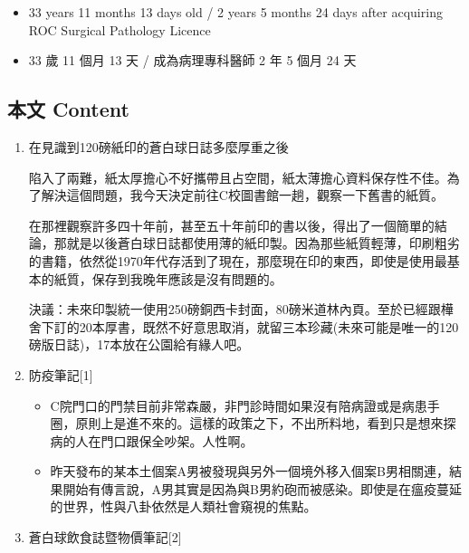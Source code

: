 \documentclass[
]{article}
\providecommand{\tightlist}{%
  \setlength{\itemsep}{0pt}\setlength{\parskip}{0pt}}
\begin{document}
\begin{itemize}
\tightlist
\item
  33 years 11 months 13 days old / 2 years 5 months 24 days after
  acquiring ROC Surgical Pathology Licence
\item
  33 歲 11 個月 13 天 / 成為病理專科醫師 2 年 5 個月 24 天
\end{itemize}

\hypertarget{ux672cux6587-content-4}{%
\subsection{本文 Content}\label{ux672cux6587-content-4}}

\begin{enumerate}
\def\labelenumi{\arabic{enumi}.}
\item
  在見識到120磅紙印的蒼白球日誌多麼厚重之後

  陷入了兩難，紙太厚擔心不好攜帶且占空間，紙太薄擔心資料保存性不佳。為了解決這個問題，我今天決定前往C校圖書館一趟，觀察一下舊書的紙質。

  在那裡觀察許多四十年前，甚至五十年前印的書以後，得出了一個簡單的結論，那就是以後蒼白球日誌都使用薄的紙印製。因為那些紙質輕薄，印刷粗劣的書籍，依然從1970年代存活到了現在，那麼現在印的東西，即使是使用最基本的紙質，保存到我晚年應該是沒有問題的。

  決議：未來印製統一使用250磅銅西卡封面，80磅米道林內頁。至於已經跟樺舍下訂的20本厚書，既然不好意思取消，就留三本珍藏(未來可能是唯一的120磅版日誌)，17本放在公園給有緣人吧。
\item
  防疫筆記{[}1{]}

  \begin{itemize}
  \item
    C院門口的門禁目前非常森嚴，非門診時間如果沒有陪病證或是病患手圈，原則上是進不來的。這樣的政策之下，不出所料地，看到只是想來探病的人在門口跟保全吵架。人性啊。
  \item
    昨天發布的某本土個案A男被發現與另外一個境外移入個案B男相關連，結果開始有傳言說，A男其實是因為與B男約砲而被感染。即使是在瘟疫蔓延的世界，性與八卦依然是人類社會窺視的焦點。
  \end{itemize}
\item
  蒼白球飲食誌暨物價筆記{[}2{]}


\end{enumerate}
\end{document}
